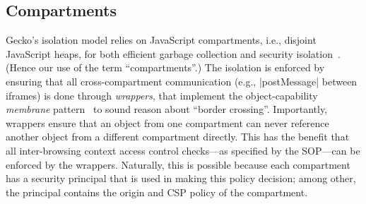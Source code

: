 \subsection{Compartments}
\begin{table}
\caption{Confining code from exfiltrating data using existing browser
mechanisms.}
\label{fig:comm}
\end{table}
 
Gecko's isolation model relies on JavaScript compartments, i.e.,
disjoint JavaScript heaps, for both efficient garbage collection and
security isolation~\cite{wagner2011compartmental}.
%
(Hence our use of the term ``compartments''.)
%
The isolation is enforced by ensuring that all cross-compartment
communication (e.g., \js|postMessage| between iframes) is done through
\emph{wrappers}, that implement the object-capability \emph{membrane}
pattern~\cite{miller2003paradigm,miller2006robust} to sound reason
about ``border crossing''. 
%
Importantly, wrappers ensure that an object from one compartment can
never reference another object from a different compartment directly.
%
This has the benefit that all inter-browsing context access control
checks---as specified by the SOP---can be enforced by the wrappers.
%
Naturally, this is possible because each compartment has a security
principal that is used in making this policy decision; among other,
the principal contains the origin and CSP policy of the compartment.

